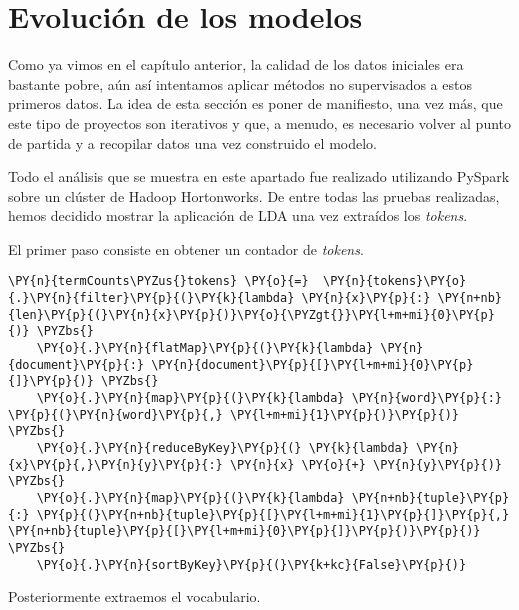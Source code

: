 \section{Evolución de los modelos}
\label{section:nosup:evol}

Como ya vimos en el capítulo anterior, la calidad de los datos iniciales era bastante pobre, aún así intentamos aplicar métodos no supervisados a estos primeros datos. La idea de esta sección es poner de manifiesto, una vez más, que este tipo de proyectos son iterativos y que, a menudo, es necesario volver al punto de partida y a recopilar datos una vez construido el modelo.


Todo el análisis que se muestra en este apartado fue realizado utilizando PySpark sobre un clúster de Hadoop Hortonworks. De entre todas las pruebas realizadas, hemos decidido mostrar la aplicación de LDA una vez extraídos los \textit{tokens}. 

El primer paso consiste en obtener un contador de \textit{tokens}.
\vspace{0.5cm}

    \begin{tcolorbox}[breakable, size=fbox, boxrule=1pt, pad at break*=1mm,colback=cellbackground, colframe=cellborder]
\begin{Verbatim}[commandchars=\\\{\}]
\PY{n}{termCounts\PYZus{}tokens} \PY{o}{=}  \PY{n}{tokens}\PY{o}{.}\PY{n}{filter}\PY{p}{(}\PY{k}{lambda} \PY{n}{x}\PY{p}{:} \PY{n+nb}{len}\PY{p}{(}\PY{n}{x}\PY{p}{)}\PY{o}{\PYZgt{}}\PY{l+m+mi}{0}\PY{p}{)} \PYZbs{}
    \PY{o}{.}\PY{n}{flatMap}\PY{p}{(}\PY{k}{lambda} \PY{n}{document}\PY{p}{:} \PY{n}{document}\PY{p}{[}\PY{l+m+mi}{0}\PY{p}{]}\PY{p}{)} \PYZbs{}
    \PY{o}{.}\PY{n}{map}\PY{p}{(}\PY{k}{lambda} \PY{n}{word}\PY{p}{:} \PY{p}{(}\PY{n}{word}\PY{p}{,} \PY{l+m+mi}{1}\PY{p}{)}\PY{p}{)} \PYZbs{}
    \PY{o}{.}\PY{n}{reduceByKey}\PY{p}{(} \PY{k}{lambda} \PY{n}{x}\PY{p}{,}\PY{n}{y}\PY{p}{:} \PY{n}{x} \PY{o}{+} \PY{n}{y}\PY{p}{)}   \PYZbs{}
    \PY{o}{.}\PY{n}{map}\PY{p}{(}\PY{k}{lambda} \PY{n+nb}{tuple}\PY{p}{:} \PY{p}{(}\PY{n+nb}{tuple}\PY{p}{[}\PY{l+m+mi}{1}\PY{p}{]}\PY{p}{,} \PY{n+nb}{tuple}\PY{p}{[}\PY{l+m+mi}{0}\PY{p}{]}\PY{p}{)}\PY{p}{)}  \PYZbs{}
    \PY{o}{.}\PY{n}{sortByKey}\PY{p}{(}\PY{k+kc}{False}\PY{p}{)}
\end{Verbatim}
\end{tcolorbox}

Posteriormente extraemos el vocabulario.

